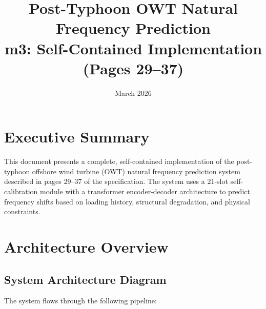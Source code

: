 \documentclass[11pt]{article}
\title{Post-Typhoon OWT Natural Frequency Prediction \\
\Large m3: Self-Contained Implementation (Pages 29--37)}
\author{}
\date{March 2026}
\begin{document}
\maketitle

\tableofcontents
\newpage

\section{Executive Summary}
This document presents a complete, self-contained implementation of the post-typhoon offshore wind turbine (OWT) natural frequency prediction system described in pages 29--37 of the specification. The system uses a 21-slot self-calibration module with a transformer encoder-decoder architecture to predict frequency shifts based on loading history, structural degradation, and physical constraints.

\section{Architecture Overview}

\subsection{System Architecture Diagram}

The system flows through the following pipeline:
\end{document}
